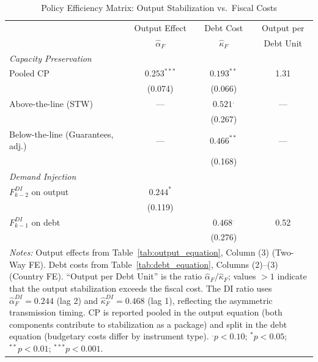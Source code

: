 \documentclass[12pt, a4paper]{article}
\begin{document}
\begin{table}[htbp]
\centering
\caption{Policy Efficiency Matrix: Output Stabilization vs.\ Fiscal Costs}
\label{tab:policy_matrix}
\small
\begin{tabular}{lccc}
\toprule
 & Output Effect & Debt Cost & Output per \\
 & $\hat{\alpha}_F$ & $\hat{\kappa}_F$ & Debt Unit \\
\midrule
\textit{Capacity Preservation} \\[2pt]
\quad Pooled CP
  & $0.253^{***}$ & $0.193^{**}$  & 1.31 \\
  & (0.074)       & (0.066)       &      \\[4pt]
\quad Above-the-line (STW)
  & ---           & $0.521^{.}$   & ---  \\
  &               & (0.267)       &      \\[4pt]
\quad Below-the-line (Guarantees, adj.)
  & ---           & $0.466^{**}$  & ---  \\
  &               & (0.168)       &      \\[6pt]
\textit{Demand Injection} \\[2pt]
\quad $F^{DI}_{k-2}$ on output
  & $0.244^{*}$   &               &      \\
  & (0.119)       &               &      \\[4pt]
\quad $F^{DI}_{k-1}$ on debt
  &               & $0.468^{.}$   & 0.52 \\
  &               & (0.276)       &      \\[6pt]
\midrule
\multicolumn{4}{p{10cm}}{\footnotesize \textit{Notes:} Output effects from Table~\ref{tab:output_equation}, Column (3) (Two-Way FE). Debt costs from Table~\ref{tab:debt_equation}, Columns (2)--(3) (Country FE). ``Output per Debt Unit'' is the ratio $\hat{\alpha}_F / \hat{\kappa}_F$; values $>1$ indicate that the output stabilization exceeds the fiscal cost. The DI ratio uses $\hat{\alpha}^{DI}_F = 0.244$ (lag 2) and $\hat{\kappa}^{DI}_F = 0.468$ (lag 1), reflecting the asymmetric transmission timing. CP is reported pooled in the output equation (both components contribute to stabilization as a package) and split in the debt equation (budgetary costs differ by instrument type). $^{.}p<0.10$; $^{*}p<0.05$; $^{**}p<0.01$; $^{***}p<0.001$.} \\
\end{tabular}
\end{table}
\end{document}
